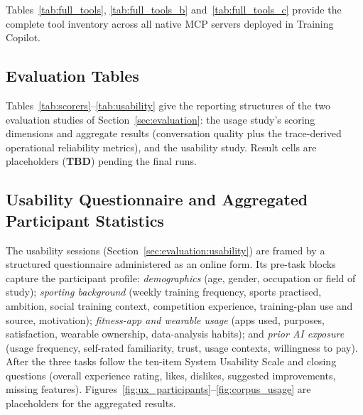 Tables~\ref{tab:full_tools}, \ref{tab:full_tools_b} and~\ref{tab:full_tools_c} provide the complete tool inventory across all native MCP servers deployed in Training Copilot.



\FloatBarrier
\subsection{Evaluation Tables}\label{sec:appendix:evaltables}

Tables~\ref{tab:scorers}--\ref{tab:usability} give the reporting structures of the two evaluation studies of Section~\ref{sec:evaluation}: the usage study's scoring dimensions and aggregate results (conversation quality plus the trace-derived operational reliability metrics), and the usability study. Result cells are placeholders (\textbf{TBD}) pending the final runs.







\FloatBarrier
\subsection{Usability Questionnaire and Aggregated Participant Statistics}\label{sec:appendix:ux}

The usability sessions (Section~\ref{sec:evaluation:usability}) are framed by a structured questionnaire administered as an online form. Its pre-task blocks capture the participant profile: \textit{demographics} (age, gender, occupation or field of study); \textit{sporting background} (weekly training frequency, sports practised, ambition, social training context, competition experience, training-plan use and source, motivation); \textit{fitness-app and wearable usage} (apps used, purposes, satisfaction, wearable ownership, data-analysis habits); and \textit{prior AI exposure} (usage frequency, self-rated familiarity, trust, usage contexts, willingness to pay). After the three tasks follow the ten-item System Usability Scale and closing questions (overall experience rating, likes, dislikes, suggested improvements, missing features). Figures~\ref{fig:ux_participants}--\ref{fig:corpus_usage} are placeholders for the aggregated results.





